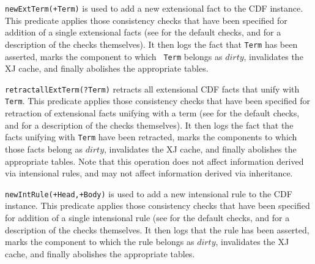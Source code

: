\begin{description}

{\tt newExtTerm(+Term)} is used to add a new extensional fact to the
CDF instance.  This predicate applies those consistency checks that
have been specified for addition of a single extensional facts (see
 for the default checks, and 
for a description of the checks themselves).  It then logs the fact
that {\tt Term} has been asserted, marks the component to which {\tt
Term} belongs as $dirty$, invalidates the XJ cache, and finally
abolishes the appropriate tables.


{\tt retractallExtTerm(?Term)} retracts all extensional CDF facts that
unify with {\tt Term}.  This predicate applies those consistency
checks that have been specified for retraction of extensional facts
unifying with a term (see  for the default checks,
and  for a description of the checks themselves).
It then logs the fact that the facts unifying with {\tt Term} have
been retracted, marks the components to which those facts belong as
$dirty$, invalidates the XJ cache, and finally abolishes the
appropriate tables.  Note that this operation does not affect
information derived via intensional rules, and may not affect
information derived via inheritance.



{\tt newIntRule(+Head,+Body)} is used to add a new intensional rule to
the CDF instance.  This predicate applies those consistency checks
that have been specified for addition of a single intensional rule
(see  for the default checks, and
 for a description of the checks themselves.  It
then logs that the rule has been asserted, marks the component to
which the rule belongs as $dirty$, invalidates the XJ cache, and
finally abolishes the appropriate tables.


\end{description}
